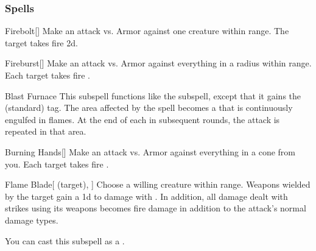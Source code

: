 \subsubsection{Spells}


\begin{ability}[\nth{1}]{Firebolt}[]
Make an attack vs. Armor against one creature within \rngmed range.
\hit The target takes fire  \plus2d.
\end{ability}
\vspace{0.25em}



\begin{ability}[\nth{1}]{Fireburst}[]
Make an attack vs. Armor against everything in a \areasmall radius within \rngclose range.
\hit Each target takes fire .
\end{ability}
\vspace{0.25em}



\begin{ability}[\nth{2}]{Blast Furnace}
This subspell functions like the  subspell, except that it gains the  (standard) tag.
The area affected by the spell becomes a  that is continuously engulfed in flames.
At the end of each  in subsequent rounds, the attack is repeated in that area.
\end{ability}
\vspace{0.25em}



\begin{ability}[\nth{2}]{Burning Hands}[]
Make an attack vs. Armor against everything in a \arealarge cone from you.
\hit Each target takes fire .
\end{ability}
\vspace{0.25em}



\begin{ability}[\nth{2}]{Flame Blade}[ (target), ]
Choose a willing creature within \rngclose range.
Weapons wielded by the target gain a \plus1d  to damage with .
In addition, all damage dealt with strikes using its weapons becomes fire damage in addition to the attack's normal damage types.

You can cast this subspell as a .
\end{ability}
\vspace{0.25em}



